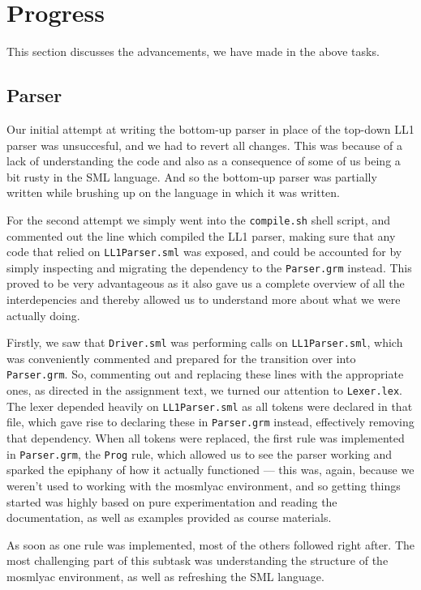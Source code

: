 \documentclass[11pt]{article}
\begin{document}
\section{Progress}
This section discusses the advancements, we have made in the above tasks.

\subsection{Parser}
Our initial attempt at writing the bottom-up parser in place of the top-down
LL1 parser was unsuccesful, and we had to revert all changes. This was because
of a lack of understanding the code and also as a consequence of some of us
being a bit rusty in the SML language. And so the bottom-up parser was
partially written while brushing up on the language in which it was written.

For the second attempt we simply went into the {\tt compile.sh} shell script,
and commented out the line which compiled the LL1 parser, making sure that any
code that relied on {\tt LL1Parser.sml} was exposed, and could be accounted
for by simply inspecting and migrating the dependency to the {\tt Parser.grm}
instead. This proved to be very advantageous as it also gave us a complete
overview of all the interdepencies and thereby allowed us to understand more
about what we were actually doing.

Firstly, we saw that {\tt Driver.sml} was performing calls on
{\tt LL1Parser.sml}, which was conveniently commented and prepared for the
transition over into {\tt Parser.grm}. So, commenting out and replacing these
lines with the appropriate ones, as directed in the assignment text, we turned
our attention to {\tt Lexer.lex}. The lexer depended heavily on
{\tt LL1Parser.sml} as all tokens were declared in that file, which gave rise
to declaring these in {\tt Parser.grm} instead, effectively removing that
dependency. When all tokens were replaced, the first rule was implemented in
{\tt Parser.grm}, the {\tt Prog} rule, which allowed us to see the parser
working and sparked the epiphany of how it actually functioned --- this was,
again, because we weren't used to working with the mosmlyac environment, and
so getting things started was highly based on pure experimentation and reading
the documentation, as well as examples provided as course materials.

As soon as one rule was implemented, most of the others followed right after.
The most challenging part of this subtask was understanding the structure of
the mosmlyac environment, as well as refreshing the SML language.
\end{document}
